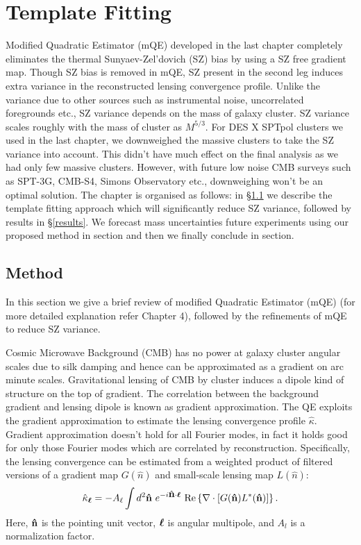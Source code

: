 \chapter{Template Fitting}
\label{ch:template}

Modified Quadratic Estimator (mQE) developed in the last chapter completely eliminates the thermal Sunyaev-Zel'dovich (SZ) bias by using a SZ free gradient map. 
Though SZ bias is removed in mQE, SZ present in the second leg induces extra variance in the reconstructed lensing convergence profile. 
Unlike the variance due to other sources such as instrumental noise, uncorrelated foregrounds etc., SZ variance depends on the mass of galaxy cluster.
SZ variance scales roughly with the mass of cluster as $M^{5/3}$.
For DES X SPTpol clusters we used in the last chapter, we downweighed the massive clusters to take the SZ variance into account. 
This didn't have much effect on the final analysis as we had only few massive clusters. 
However, with future low noise CMB surveys such as SPT-3G, CMB-S4, Simons Observatory etc., downweighing won't be an optimal solution.
The chapter is organised as follows: in  \S\ref{sec_methods} we describe the template fitting approach which will significantly reduce SZ variance, followed by results in \S\ref{results}. 
We forecast mass uncertainties future experiments using our proposed method in section and then we finally conclude in section.
\section{Method}
\label{sec_methods}
In this section we give a brief review of modified Quadratic Estimator (mQE) (for more detailed explanation refer Chapter 4), followed by the refinements of mQE to reduce SZ variance.


 Cosmic Microwave Background (CMB) has no power at galaxy cluster angular scales due to silk damping and hence can be approximated as a gradient on arc minute scales.
 Gravitational lensing of CMB by cluster induces a dipole kind of structure on the top of gradient.
 The correlation between the background gradient and lensing dipole is known as gradient approximation.    
The QE \citep{hu02a} exploits the gradient approximation to estimate the lensing convergence profile $\hat{\kappa}$. 
 Gradient approximation doesn't hold for all Fourier modes, in fact it holds good for only those Fourier modes which are correlated by reconstruction. 
 Specifically, the lensing convergence can be estimated from a weighted product of filtered versions of a gradient map $G(\hat{n})$ and  small-scale lensing map $L(\hat{n})$: 
\begin{equation}
\hat{\kappa}_{\bm{\ell}} =-A_{\ell}\int d^{2}\bm{\hat{\mbox{n}}}\ e^{-i\bm{\hat{\mbox{n}}}\cdot\bm{\ell}}\ {\rm Re} \left\{ \nabla \cdot \left[ G(\bm{\hat{\mbox{n}}}) L^{*}(\bm{\hat{\mbox{n}}})\right]\right\}.
\label{eq_QE_kappa}
\end{equation} 
Here, $\bm{\hat{\mbox{n}}}$ is the pointing unit vector, $\bm{\ell}$ is angular multipole, and $A_{l}$ is a normalization factor. 


